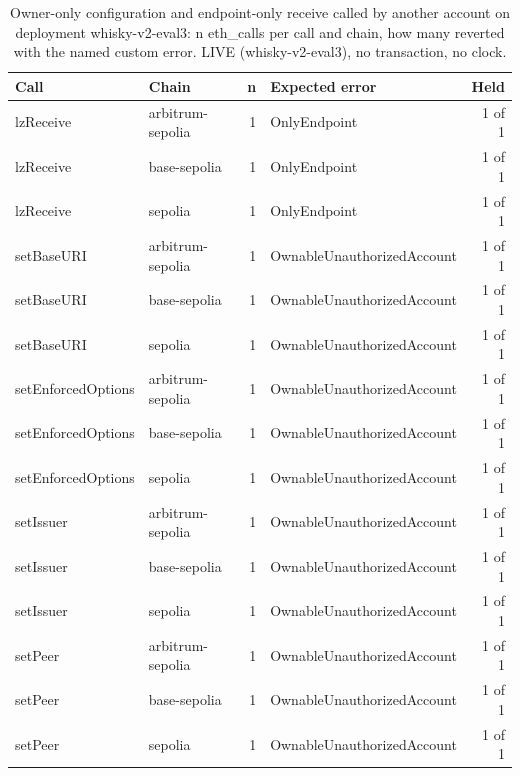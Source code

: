 \begin{table}[htbp]
    \centering
    \small
    \begin{tabular}{llrlr}
    \toprule
    Call & Chain & n & Expected error & Held \\
    \midrule
    lzReceive & arbitrum-sepolia & 1 & OnlyEndpoint & 1 of 1 \\
    lzReceive & base-sepolia & 1 & OnlyEndpoint & 1 of 1 \\
    lzReceive & sepolia & 1 & OnlyEndpoint & 1 of 1 \\
    setBaseURI & arbitrum-sepolia & 1 & OwnableUnauthorizedAccount & 1 of 1 \\
    setBaseURI & base-sepolia & 1 & OwnableUnauthorizedAccount & 1 of 1 \\
    setBaseURI & sepolia & 1 & OwnableUnauthorizedAccount & 1 of 1 \\
    setEnforcedOptions & arbitrum-sepolia & 1 & OwnableUnauthorizedAccount & 1 of 1 \\
    setEnforcedOptions & base-sepolia & 1 & OwnableUnauthorizedAccount & 1 of 1 \\
    setEnforcedOptions & sepolia & 1 & OwnableUnauthorizedAccount & 1 of 1 \\
    setIssuer & arbitrum-sepolia & 1 & OwnableUnauthorizedAccount & 1 of 1 \\
    setIssuer & base-sepolia & 1 & OwnableUnauthorizedAccount & 1 of 1 \\
    setIssuer & sepolia & 1 & OwnableUnauthorizedAccount & 1 of 1 \\
    setPeer & arbitrum-sepolia & 1 & OwnableUnauthorizedAccount & 1 of 1 \\
    setPeer & base-sepolia & 1 & OwnableUnauthorizedAccount & 1 of 1 \\
    setPeer & sepolia & 1 & OwnableUnauthorizedAccount & 1 of 1 \\
    \bottomrule
    \end{tabular}
    \caption{Owner-only configuration and endpoint-only receive called by another account on deployment whisky-v2-eval3: n eth\_calls per call and chain, how many reverted with the named custom error. LIVE (whisky-v2-eval3), no transaction, no clock.}
    \label{tab:edge-configuration}
\end{table}

